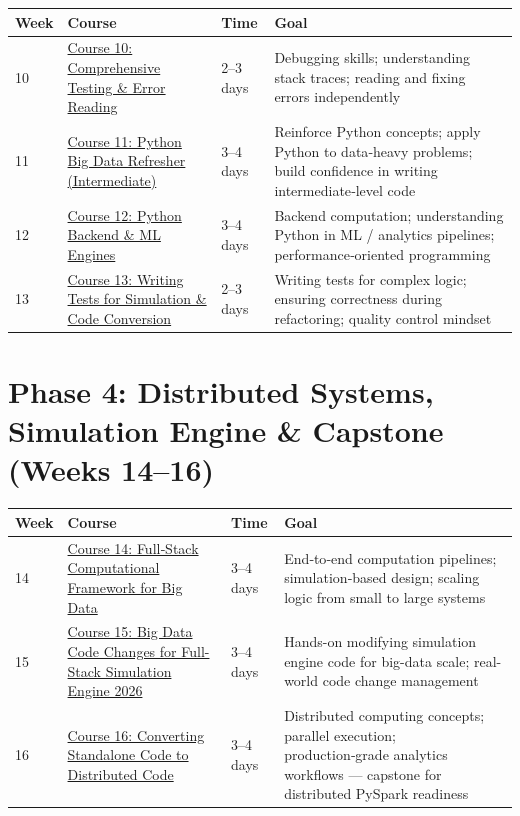 \documentclass[12pt]{article}
\begin{document}
	\begin{tabularx}{\textwidth}{|X|p{3cm}|p{3cm}|X|}
		\hline
		\textbf{Week} & \textbf{Course} & \textbf{Time} & \textbf{Goal} \\
		\hline
		10 & \href{https://www.udemy.com/course/full-spectrum-comprehensive-testing-error-reading-101/}{Course 10: Comprehensive Testing \& Error Reading} & 2–3 days & Debugging skills; understanding stack traces; reading and fixing errors independently \\
		\hline
		11 & \href{https://www.udemy.com/course/refresher-python-big-data-intermediate-quiz-based-course-102/}{Course 11: Python Big Data Refresher (Intermediate)} & 3–4 days & Reinforce Python concepts; apply Python to data‑heavy problems; build confidence in writing intermediate‑level code \\
		\hline
		12 & \href{https://www.udemy.com/course/python-full-stack-and-backend-engines-for-mc-ml-engines-102/}{Course 12: Python Backend \& ML Engines} & 3–4 days & Backend computation; understanding Python in ML / analytics pipelines; performance‑oriented programming \\
		\hline
		13 & \href{https://www.udemy.com/course/writing-tests-for-simeng-python-code-conversion-concepts-101/}{Course 13: Writing Tests for Simulation \& Code Conversion} & 2–3 days & Writing tests for complex logic; ensuring correctness during refactoring; quality control mindset \\
		\hline
	\end{tabularx}
	
	\vspace{0.3cm}
	
	\section*{Phase 4: Distributed Systems, Simulation Engine \& Capstone (Weeks 14–16)}
	
	\begin{tabularx}{\textwidth}{|X|p{3cm}|p{3cm}|X|}
		\hline
		\textbf{Week} & \textbf{Course} & \textbf{Time} & \textbf{Goal} \\
		\hline
		14 & \href{https://www.udemy.com/course/full-stack-computational-framework-for-big-data-simulations/}{Course 14: Full‑Stack Computational Framework for Big Data} & 3–4 days & End‑to‑end computation pipelines; simulation‑based design; scaling logic from small to large systems \\
		\hline
		15 & \href{https://www.udemy.com/course/big-data-code-changes-for-full-stack-simulation-engine-2026/}{Course 15: Big Data Code Changes for Full-Stack Simulation Engine 2026} & 3–4 days & Hands-on modifying simulation engine code for big-data scale; real-world code change management \\
		\hline
		16 & \href{https://www.udemy.com/course/converting-standalone-code-to-distributed-code-for-analytics/}{Course 16: Converting Standalone Code to Distributed Code} & 3–4 days & Distributed computing concepts; parallel execution; production‑grade analytics workflows — capstone for distributed PySpark readiness \\
		\hline
	\end{tabularx}
	
\end{document}
